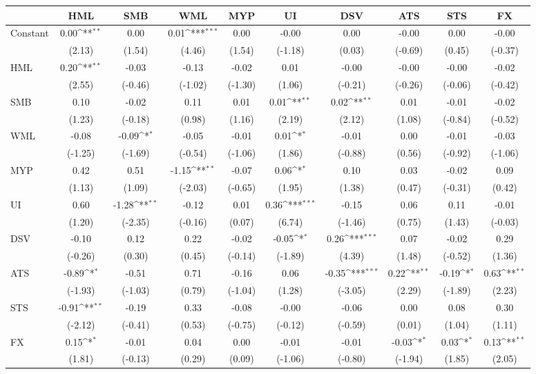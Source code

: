 {
\def\sym#1{\ifmmode^{#1}\else\(^{#1}\)\fi}
\begin{tabular}{@{\extracolsep{2pt}}l*{9}{c}@{}}
\hline\hline
& HML& SMB& WML& MYP& UI& DSV& ATS& STS& FX\\
\hline
Constant & 0.00\sym{**} & 0.00 & 0.01\sym{***} & 0.00 & -0.00 & 0.00 & -0.00 & 0.00 & -0.00\\
   & (2.13) & (1.54) & (4.46) & (1.54) & (-1.18) & (0.03) & (-0.69) & (0.45) & (-0.37)\\
HML & 0.20\sym{**} & -0.03 & -0.13 & -0.02 & 0.01 & -0.00 & -0.00 & -0.00 & -0.02\\
   & (2.55) & (-0.46) & (-1.02) & (-1.30) & (1.06) & (-0.21) & (-0.26) & (-0.06) & (-0.42)\\
SMB & 0.10 & -0.02 & 0.11 & 0.01 & 0.01\sym{**} & 0.02\sym{**} & 0.01 & -0.01 & -0.02\\
   & (1.23) & (-0.18) & (0.98) & (1.16) & (2.19) & (2.12) & (1.08) & (-0.84) & (-0.52)\\
WML & -0.08 & -0.09\sym{*} & -0.05 & -0.01 & 0.01\sym{*} & -0.01 & 0.00 & -0.01 & -0.03\\
   & (-1.25) & (-1.69) & (-0.54) & (-1.06) & (1.86) & (-0.88) & (0.56) & (-0.92) & (-1.06)\\
MYP & 0.42 & 0.51 & -1.15\sym{**} & -0.07 & 0.06\sym{*} & 0.10 & 0.03 & -0.02 & 0.09\\
   & (1.13) & (1.09) & (-2.03) & (-0.65) & (1.95) & (1.38) & (0.47) & (-0.31) & (0.42)\\
UI & 0.60 & -1.28\sym{**} & -0.12 & 0.01 & 0.36\sym{***} & -0.15 & 0.06 & 0.11 & -0.01\\
   & (1.20) & (-2.35) & (-0.16) & (0.07) & (6.74) & (-1.46) & (0.75) & (1.43) & (-0.03)\\
DSV & -0.10 & 0.12 & 0.22 & -0.02 & -0.05\sym{*} & 0.26\sym{***} & 0.07 & -0.02 & 0.29\\
   & (-0.26) & (0.30) & (0.45) & (-0.14) & (-1.89) & (4.39) & (1.48) & (-0.52) & (1.36)\\
ATS & -0.89\sym{*} & -0.51 & 0.71 & -0.16 & 0.06 & -0.35\sym{***} & 0.22\sym{**} & -0.19\sym{*} & 0.63\sym{**}\\
   & (-1.93) & (-1.03) & (0.79) & (-1.04) & (1.28) & (-3.05) & (2.29) & (-1.89) & (2.23)\\
STS & -0.91\sym{**} & -0.19 & 0.33 & -0.08 & -0.00 & -0.06 & 0.00 & 0.08 & 0.30\\
   & (-2.12) & (-0.41) & (0.53) & (-0.75) & (-0.12) & (-0.59) & (0.01) & (1.04) & (1.11)\\
FX & 0.15\sym{*} & -0.01 & 0.04 & 0.00 & -0.01 & -0.01 & -0.03\sym{*} & 0.03\sym{*} & 0.13\sym{**}\\
   & (1.81) & (-0.13) & (0.29) & (0.09) & (-1.06) & (-0.80) & (-1.94) & (1.85) & (2.05)\\
\hline
\hline
\end{tabular}
}
